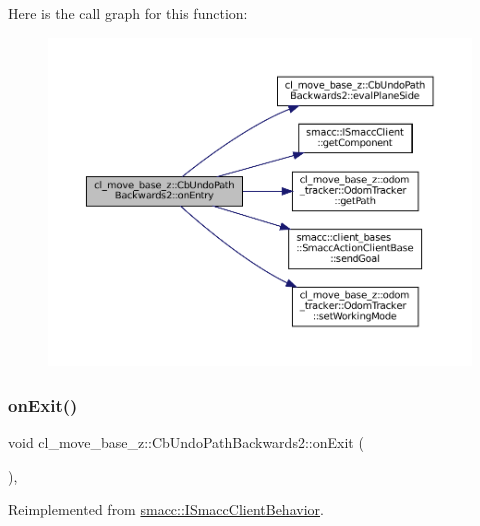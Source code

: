 Here is the call graph for this function\+:
\nopagebreak
\begin{figure}[H]
\begin{center}
\leavevmode
\includegraphics[width=350pt]{classcl__move__base__z_1_1CbUndoPathBackwards2_a1b96187df9be6ce0fbdb5511147685d3_cgraph}
\end{center}
\end{figure}
\mbox{\label{classcl__move__base__z_1_1CbUndoPathBackwards2_ae493fcd813176d8473ff08680beb7afe}} 
\subsubsection{\texorpdfstring{on\+Exit()}{onExit()}}
{\footnotesize\ttfamily void cl\+\_\+move\+\_\+base\+\_\+z\+::\+Cb\+Undo\+Path\+Backwards2\+::on\+Exit (\begin{DoxyParamCaption}{ }\end{DoxyParamCaption})\hspace{0.3cm}{\ttfamily [override]}, {\ttfamily [virtual]}}



Reimplemented from \hyperlink{classsmacc_1_1ISmaccClientBehavior_ad1198fdb2cbdf11f3276d3e23d4c0a50}{smacc\+::\+I\+Smacc\+Client\+Behavior}.



